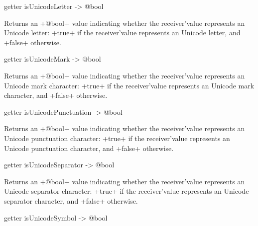 
\begin{galgas}
getter isUnicodeLetter -> @bool
\end{galgas}

Returns an \ggs+@bool+ value indicating whether the receiver'value represents an Unicode letter: \ggs+true+ if the receiver'value represents an Unicode letter, and \ggs+false+ otherwise.







\begin{galgas}
getter isUnicodeMark -> @bool
\end{galgas}

Returns an \ggs+@bool+ value indicating whether the receiver'value represents an Unicode mark character: \ggs+true+ if the receiver'value represents an Unicode mark character, and \ggs+false+ otherwise.







\begin{galgas}
getter isUnicodePunctuation -> @bool
\end{galgas}

Returns an \ggs+@bool+ value indicating whether the receiver'value represents an Unicode punctuation character: \ggs+true+ if the receiver'value represents an Unicode punctuation character, and \ggs+false+ otherwise.







\begin{galgas}
getter isUnicodeSeparator -> @bool
\end{galgas}

Returns an \ggs+@bool+ value indicating whether the receiver'value represents an Unicode separator character: \ggs+true+ if the receiver'value represents an Unicode separator character, and \ggs+false+ otherwise.







\begin{galgas}
getter isUnicodeSymbol -> @bool
\end{galgas}

